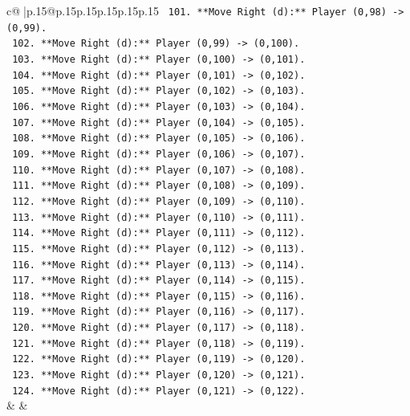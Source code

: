 \documentclass{article}
\begin{document}
{\begin{supertabular}{c@{$\;$}|p{.15\linewidth}@{}p{.15\linewidth}p{.15\linewidth}p{.15\linewidth}p{.15\linewidth}p{.15\linewidth}}
{{{\texttt{        101. **Move Right (d):** Player (0,98) {-}> (0,99).} \\
\texttt{        102. **Move Right (d):** Player (0,99) {-}> (0,100).} \\
\texttt{        103. **Move Right (d):** Player (0,100) {-}> (0,101).} \\
\texttt{        104. **Move Right (d):** Player (0,101) {-}> (0,102).} \\
\texttt{        105. **Move Right (d):** Player (0,102) {-}> (0,103).} \\
\texttt{        106. **Move Right (d):** Player (0,103) {-}> (0,104).} \\
\texttt{        107. **Move Right (d):** Player (0,104) {-}> (0,105).} \\
\texttt{        108. **Move Right (d):** Player (0,105) {-}> (0,106).} \\
\texttt{        109. **Move Right (d):** Player (0,106) {-}> (0,107).} \\
\texttt{        110. **Move Right (d):** Player (0,107) {-}> (0,108).} \\
\texttt{        111. **Move Right (d):** Player (0,108) {-}> (0,109).} \\
\texttt{        112. **Move Right (d):** Player (0,109) {-}> (0,110).} \\
\texttt{        113. **Move Right (d):** Player (0,110) {-}> (0,111).} \\
\texttt{        114. **Move Right (d):** Player (0,111) {-}> (0,112).} \\
\texttt{        115. **Move Right (d):** Player (0,112) {-}> (0,113).} \\
\texttt{        116. **Move Right (d):** Player (0,113) {-}> (0,114).} \\
\texttt{        117. **Move Right (d):** Player (0,114) {-}> (0,115).} \\
\texttt{        118. **Move Right (d):** Player (0,115) {-}> (0,116).} \\
\texttt{        119. **Move Right (d):** Player (0,116) {-}> (0,117).} \\
\texttt{        120. **Move Right (d):** Player (0,117) {-}> (0,118).} \\
\texttt{        121. **Move Right (d):** Player (0,118) {-}> (0,119).} \\
\texttt{        122. **Move Right (d):** Player (0,119) {-}> (0,120).} \\
\texttt{        123. **Move Right (d):** Player (0,120) {-}> (0,121).} \\
\texttt{        124. **Move Right (d):** Player (0,121) {-}> (0,122).} \\
            }
        }
    }
    & & \\ \\


\end{supertabular}}
\end{document}
